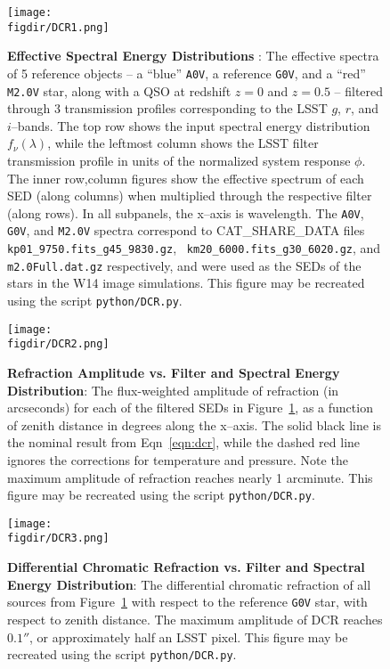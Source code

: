 \documentclass[prd, nofootinbib, floatfix, 11pt, tightenlines, times]{article}
\def\figdir{../figures}
\begin{document}
\clearpage
\begin{figure}[h!]
  \centering
  \texttt{[image: \\figdir/DCR1.png]}
  \caption{{\bf Effective Spectral Energy Distributions} : The
    effective spectra of 5 reference objects -- a ``blue'' {\tt A0V},
    a reference {\tt G0V}, and a ``red'' {\tt M2.0V} star, along with
    a QSO at redshift $z=0$ and $z=0.5$ -- filtered through 3
    transmission profiles corresponding to the LSST $g$, $r$, and
    $i$--bands.  The top row shows the input spectral energy
    distribution $f_\nu(\lambda)$, while the leftmost column shows the
    LSST filter transmission profile in units of the normalized
    system response $\phi$.  The inner row,column figures show the
    effective spectrum of each SED (along columns) when multiplied
    through the respective filter (along rows).  In all subpanels, the
    x--axis is wavelength.  The {\tt A0V}, {\tt G0V}, and {\tt M2.0V}
    spectra correspond to {CAT\_SHARE\_DATA} files {\tt
      kp01\_9750.fits\_g45\_9830.gz}, {\tt
      km20\_6000.fits\_g30\_6020.gz}, and {\tt m2.0Full.dat.gz}
    respectively, and were used as the SEDs of the stars in the W14
    image simulations.  This figure may be recreated using the script
    {\tt python/DCR.py}.}
  \label{fig:spectra}
\end{figure}

\clearpage
\begin{figure}[h!]
  \centering
  \texttt{[image: \\figdir/DCR2.png]}
  \caption{{\bf Refraction Amplitude vs. Filter and Spectral Energy
      Distribution}: The flux-weighted amplitude of refraction (in
    arcseconds) for each of the filtered SEDs in
    Figure~\ref{fig:spectra}, as a function of zenith distance in
    degrees along the x--axis.  The solid black line is the nominal
    result from Eqn~\ref{eqn:dcr}, while the dashed red line ignores
    the corrections for temperature and pressure.  Note the maximum
    amplitude of refraction reaches nearly 1 arcminute.  This figure
    may be recreated using the script {\tt python/DCR.py}.}
  \label{fig:refraction}
\end{figure}

\clearpage
\begin{figure}[h!]
  \centering
  \texttt{[image: \\figdir/DCR3.png]}
  \caption{{\bf Differential Chromatic Refraction vs. Filter and
      Spectral Energy Distribution}: The differential chromatic
    refraction of all sources from Figure~\ref{fig:spectra} with
    respect to the reference {\tt G0V} star, with respect to zenith
    distance.  The maximum amplitude of DCR reaches $0.1''$, or
    approximately half an LSST pixel.  This figure may be recreated
    using the script {\tt python/DCR.py}.}
  \label{fig:dcr}
\end{figure}
\end{document}
